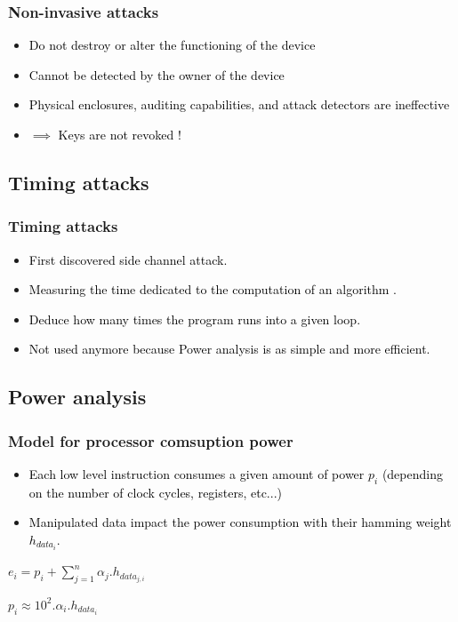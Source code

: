 \documentclass{beamer}
\begin{document}
\begin{frame}
    \frametitle{Non-invasive attacks}
    \begin{itemize}
        \item \textcolor{black} {Do not destroy or alter the functioning of the device}
        \item \textcolor{black} {Cannot be detected by the owner of the device}
	\item \textcolor{black} {Physical enclosures, auditing capabilities, and attack detectors are ineffective}
	\item \textcolor{black} {$\implies$ Keys are not revoked !}
    \end{itemize}

\end{frame}

    \subsection{Timing attacks}

\begin{frame}
    \frametitle{Timing attacks}
    \begin{itemize}
        \item \textcolor{black} {First discovered side channel attack.}
        \item \textcolor{black} {Measuring the time dedicated to the computation of an algorithm .} 
	\item \textcolor{black} {Deduce how many times the program runs into a given loop.} 
	\item \textcolor{black} {Not used anymore because Power analysis is as simple and more efficient.} 
    \end{itemize}
\end{frame}


    \subsection{Power analysis}

\begin{frame}
    \frametitle{Model for processor comsuption power}
    \begin{itemize}
        \item \textcolor{black} {Each low level instruction consumes a given amount of power $p_{i}$ (depending on the number of clock cycles, registers, etc...)}
        \item \textcolor{black} {Manipulated data impact the power consumption with their hamming weight $h_{data_{i}}$.} 
    \end{itemize}
\begin{center}
    $ e_{i} = p_{i} + \sum_{j=1}^{n} \alpha_{j}. h_{data_{j,i}}$\\
\end{center} 

    $ p_{i} \approx 10^{2}.\alpha_{i}. h_{data_{i}}$\\
\end{frame}
\end{document}
